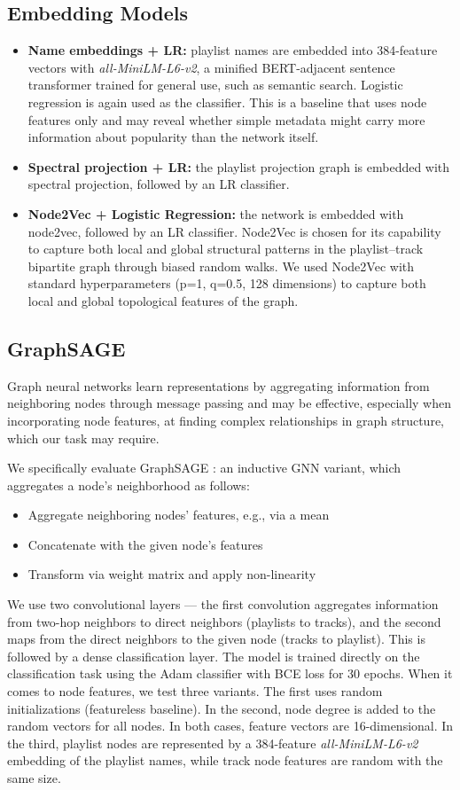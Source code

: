\documentclass[9pt,twocolumn,twoside]{pnas-report}
\begin{document}
\subsection{Embedding Models}
\begin{itemize}
    \item \textbf{Name embeddings + LR:} playlist names are embedded into 384-feature vectors with \textit{all-MiniLM-L6-v2}, a minified BERT-adjacent sentence transformer trained for general use, such as semantic search. Logistic regression is again used as the classifier. This is a baseline that uses node features only and may reveal whether simple metadata might carry more information about popularity than the network itself.
    \item \textbf{Spectral projection + LR:} the playlist projection graph is embedded with spectral projection, followed by an LR classifier.
    \item \textbf{Node2Vec + Logistic Regression:} the network is embedded with node2vec, followed by an LR classifier. Node2Vec is chosen for its capability to capture both local and global structural patterns in the playlist–track bipartite graph through biased random walks.
    We used Node2Vec with standard hyperparameters (p=1, q=0.5, 128 dimensions) to capture both local and global topological features of the graph.
\end{itemize}

\subsection{GraphSAGE}
Graph neural networks learn representations by aggregating information from neighboring nodes through message passing and may be effective, especially when incorporating node features, at finding complex relationships in graph structure, which our task may require.

We specifically evaluate GraphSAGE \cite{hamilton2017inductive}: an inductive GNN variant, which aggregates a node's neighborhood as follows:
\begin{itemize}
    \item Aggregate neighboring nodes' features, e.g., via a mean
    \item Concatenate with the given node's features
    \item Transform via weight matrix and apply non-linearity
\end{itemize}
We use two convolutional layers --- the first convolution aggregates information from two-hop neighbors to direct neighbors (playlists to tracks), and the second maps from the direct neighbors to the given node (tracks to playlist). This is followed by a dense classification layer. 
The model is trained directly on the classification task using the Adam classifier with BCE loss for 30 epochs.
When it comes to node features, we test three variants. The first uses random initializations (featureless baseline). In the second, node degree is added to the random vectors for all nodes. In both cases, feature vectors are 16-dimensional. In the third, playlist nodes are represented by a 384-feature \textit{all-MiniLM-L6-v2} embedding of the playlist names, while track node features are random with the same size.
\end{document}
